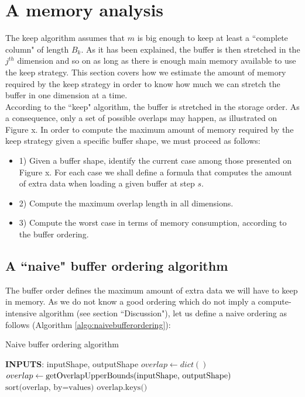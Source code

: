 \documentclass[conference]{IEEEtran}
\begin{document}
\section*{A memory analysis}

The keep algorithm assumes that $m$ is big enough to keep at least a ``complete column" of length $B_k$.
As it has been explained, the buffer is then stretched in the $j^{th}$ dimension and so on as long as there is enough main memory available to use the keep strategy.
This section covers how we estimate the amount of memory required by the keep strategy in order to know how much we can stretch the buffer in one dimension at a time. \\

According to the ``keep" algorithm, the buffer is stretched in the storage order.
As a consequence, only a set of possible overlaps may happen, as illustrated on Figure x.
In order to compute the maximum amount of memory required by the keep strategy given a specific buffer shape, we must proceed as follows:
\begin{itemize}
  \item 1) Given a buffer shape, identify the current case among those presented on Figure x. For each case we shall define a formula that computes the amount of extra data when loading a given buffer at step $s$.
  \item 2) Compute the maximum overlap length in all dimensions.
  \item 3) Compute the worst case in terms of memory consumption, according to the buffer ordering.
\end{itemize}

\subsection{A ``naive" buffer ordering algorithm}
The buffer order defines the maximum amount of extra data we will have to keep in memory.
As we do not know a good ordering which do not imply a compute-intensive algorithm (see section ``Discussion"), let us define a naive ordering as follows (Algorithm \ref{algo:naivebufferordering}):

\begin{algorithm}[H]
  \caption{Naive buffer ordering algorithm}
  \begin{algorithmic}[1]
  \STATE \textbf{INPUTS}: inputShape, outputShape
  \STATE $overlap \leftarrow dict()$
  \STATE $overlap \leftarrow \textrm{getOverlapUpperBounds(\textrm{inputShape, outputShape})}$
  \STATE $\textrm{sort(overlap, by=values)}$
  \RETURN $\textrm{overlap.keys()}$

  \end{algorithmic}
  \label{algo:naivebufferordering}
\end{algorithm}
\end{document}
